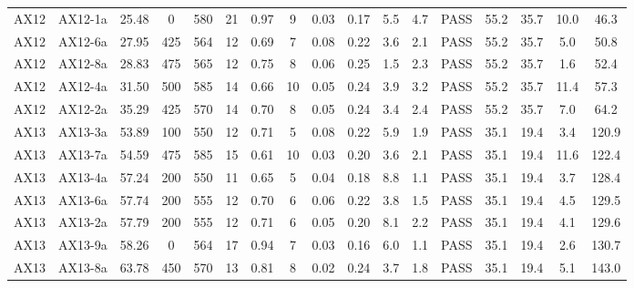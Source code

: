 \documentclass[9pt,twoside]{pnas-new}
\begin{document}
\begin{table}
\begin{tabular}{ccccccccccccccccc}
AX12 & AX12-1a  & 25.48     & 0         & 580       & 21 & 0.97 & 9     & 0.03    & 0.17    & 5.5            & 4.7             & PASS & 55.2       & 35.7          & 10.0     & 46.3          \\
AX12 & AX12-6a  & 27.95     & 425       & 564       & 12 & 0.69 & 7     & 0.08    & 0.22    & 3.6            & 2.1             & PASS & 55.2       & 35.7          & 5.0      & 50.8          \\
AX12 & AX12-8a  & 28.83     & 475       & 565       & 12 & 0.75 & 8     & 0.06    & 0.25    & 1.5            & 2.3             & PASS & 55.2       & 35.7          & 1.6      & 52.4          \\
AX12 & AX12-4a  & 31.50     & 500       & 585       & 14 & 0.66 & 10    & 0.05    & 0.24    & 3.9            & 3.2             & PASS & 55.2       & 35.7          & 11.4     & 57.3          \\
AX12 & AX12-2a  & 35.29     & 425       & 570       & 14 & 0.70 & 8     & 0.05    & 0.24    & 3.4            & 2.4             & PASS & 55.2       & 35.7          & 7.0      & 64.2          \\
AX13 & AX13-3a  & 53.89     & 100       & 550       & 12 & 0.71 & 5     & 0.08    & 0.22    & 5.9            & 1.9             & PASS & 35.1       & 19.4          & 3.4      & 120.9         \\
AX13 & AX13-7a  & 54.59     & 475       & 585       & 15 & 0.61 & 10    & 0.03    & 0.20    & 3.6            & 2.1             & PASS & 35.1       & 19.4          & 11.6     & 122.4         \\
AX13 & AX13-4a  & 57.24     & 200       & 550       & 11 & 0.65 & 5     & 0.04    & 0.18    & 8.8            & 1.1             & PASS & 35.1       & 19.4          & 3.7      & 128.4         \\
AX13 & AX13-6a  & 57.74     & 200       & 555       & 12 & 0.70 & 6     & 0.06    & 0.22    & 3.8            & 1.5             & PASS & 35.1       & 19.4          & 4.5      & 129.5         \\
AX13 & AX13-2a  & 57.79     & 200       & 555       & 12 & 0.71 & 6     & 0.05    & 0.20    & 8.1            & 2.2             & PASS & 35.1       & 19.4          & 4.1      & 129.6         \\
AX13 & AX13-9a  & 58.26     & 0         & 564       & 17 & 0.94 & 7     & 0.03    & 0.16    & 6.0            & 1.1             & PASS & 35.1       & 19.4          & 2.6      & 130.7         \\
AX13 & AX13-8a  & 63.78     & 450       & 570       & 13 & 0.81 & 8     & 0.02    & 0.24    & 3.7            & 1.8             & PASS & 35.1       & 19.4          & 5.1      & 143.0         \\

\end{tabular}
\end{table}
\end{document}
